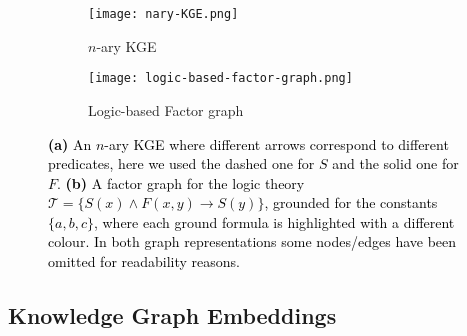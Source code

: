 \documentclass[journal]{IEEEtran}
\newcommand{\ar}[1]{\textcolor{black}{#1}}
\begin{document}
\begin{figure}[t]
  \begin{subfigure}[t]{0.49\linewidth}
    \centering\texttt{[image: nary-KGE.png]}
    \caption{$n$-ary KGE}
  \end{subfigure}
   \begin{subfigure}[t]{0.49\linewidth}
    \centering\texttt{[image: logic-based-factor-graph.png]}
    \caption{Logic-based Factor graph}
  \end{subfigure}
    \caption{\ar{\textbf{(a)} An $n$-ary KGE where different arrows correspond to different predicates, here we used the dashed one for $S$ and the solid one for $F$.}
    \ar{\textbf{(b)} A factor graph for the logic theory  $\mathcal{T} = \{S(x) \land F(x,y) \rightarrow S(y)\}$, grounded for the constants $\{a, b, c\}$, where each ground formula is highlighted with a different colour. In both graph representations some nodes/edges have been omitted for readability reasons.}}
    \label{fig:graphical_model_to_transformer}
\end{figure}


\subsection{Knowledge Graph Embeddings}
\label{sec:kge}
\end{document}
